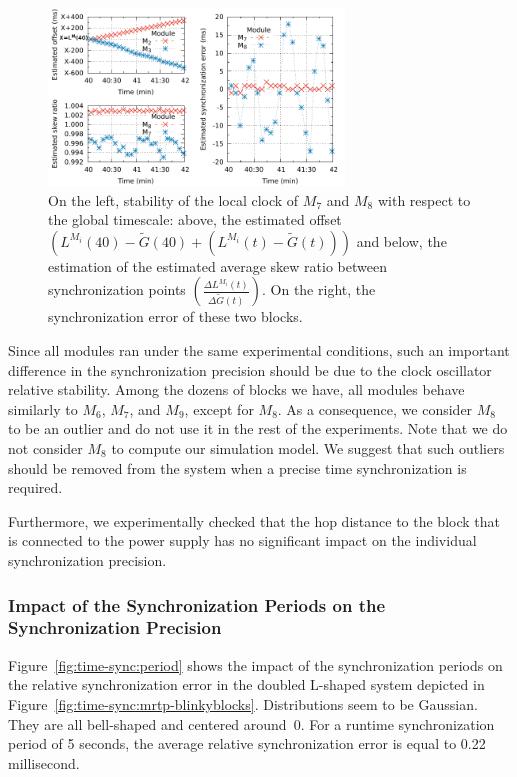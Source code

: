 \begin{figure}[h!]
	\begin{center}
		\includegraphics[width=0.7\textwidth]{images/time-synchronization/stability.pdf}
	\end{center}
	\caption{On the left, stability of the local clock of $M_7$ and $M_8$ with respect to the global timescale: above, the estimated offset $(L^{M_i}(40) - \tilde{G}(40) + (L^{M_i}(t) - \tilde{G}(t)))$ and below, the estimation of the estimated average skew ratio between synchronization points $(\frac{\Delta L^{M_i}(t)}{\Delta \tilde{G}(t)})$. On the right, the synchronization error of these two blocks. \label{fig:time-sync:hardware-instability-offset}}
\end{figure}

Since all modules ran under the same experimental conditions, such an important difference in the synchronization precision should be due to the clock oscillator relative stability. Among the dozens of blocks we have, all modules behave similarly to $M_6$, $M_7$, and $M_9$, except for $M_8$. As a consequence, we consider $M_8$ to be an outlier and do not use it in the rest of the experiments. Note that we do not consider $M_8$ to compute our simulation model. We suggest that such outliers should be removed from the system when a precise time synchronization is required.

Furthermore, we experimentally checked that the hop distance to the block that is connected to the power supply has no significant impact on the individual synchronization precision.

\subsubsection{Impact of the Synchronization Periods on the Synchronization Precision}
\label{section:time-sync:eval-period}

Figure~\ref{fig:time-sync:period} shows the impact of the synchronization periods on the relative synchronization error in the doubled L-shaped system depicted in Figure~\ref{fig:time-sync:mrtp-blinkyblocks}. Distributions seem to be Gaussian. They are all bell-shaped and centered around~0. For a runtime synchronization period of 5 seconds, the average  relative synchronization error is equal to 0.22 millisecond.

